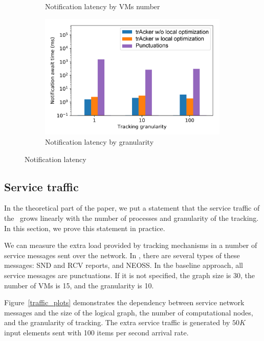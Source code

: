\begin{figure}[t!]
\begin{subfigure}[b]{0.25\textwidth}
            \caption{Notification latency by VMs number}
            \label{notification_machines}
    \end{subfigure}
    \hspace{5mm}
    \begin{subfigure}[b]{0.25\textwidth}
            \includegraphics[width=0.99\textwidth]{pics/notification_await_time_by_tracking_frequency_bars.png}
            \caption{Notification latency by granularity}
            \label{notification_granularity}
    \end{subfigure}
    \caption{Notification latency}
    \label{notification_latency}
\end{figure}

\subsection{Service traffic}
\label{exp_network_traffic}
In the theoretical part of the paper, we put a statement that the service traffic of the \tracker\ grows linearly with the number of processes and granularity of the tracking. In this section, we prove this statement in practice. 

We can measure the extra load provided by tracking mechanisms in a number of service messages sent over the network. In \tracker, there are several types of these messages: SND and RCV reports, and NEOSS. In the baseline approach, all service messages are punctuations. If it is not specified, the graph size is 30, the number of VMs is 15, and the granularity is 10.

Figure~\ref{traffic_plots} demonstrates the dependency between service network messages and the size of the logical graph, the number of computational nodes, and the granularity of tracking. The extra service traffic is generated by $50K$ input elements sent with 100 items per second arrival rate. 

